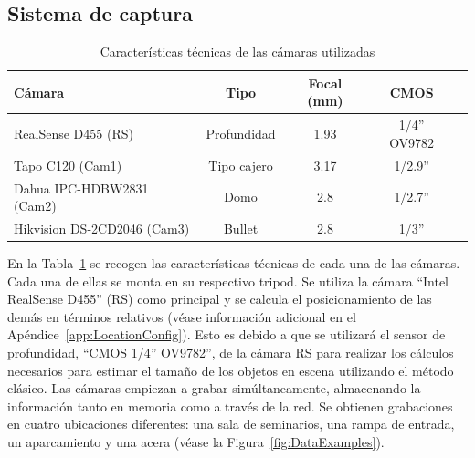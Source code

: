 \subsection{Sistema de captura}
\begin{table}[htp]
\scriptsize
\centering
\begin{tabular}{lcccc}
\hline
\textbf{Cámara} & \textbf{Tipo} & \textbf{Focal (mm)} & \textbf{CMOS} \\
\hline
RealSense D455 (RS) & Profundidad & 1.93 &  1/4'' OV9782 \\
Tapo C120 (Cam1) & Tipo cajero & 3.17 &  1/2.9'' \\
Dahua IPC-HDBW2831 (Cam2) & Domo & 2.8 &  1/2.7'' \\
Hikvision DS-2CD2046 (Cam3) & Bullet & 2.8 &  1/3'' \\
\hline
\end{tabular}
\caption{Características técnicas de las cámaras utilizadas}
\label{tab:CaptureSystem}
\end{table}
En la Tabla~\ref{tab:CaptureSystem} se recogen las características técnicas de cada una de las cámaras.
Cada una de ellas se monta en su respectivo tripod. Se utiliza la cámara ``Intel RealSense D455'' (RS) como principal y
se calcula el posicionamiento de las demás en términos relativos (véase información adicional en el Apéndice~\ref{app:LocationConfig}).
Esto es debido a que se utilizará el sensor de profundidad, ``CMOS 1/4'' OV9782'', de la cámara RS para realizar los cálculos necesarios para estimar el
tamaño de los objetos en escena utilizando el método clásico. Las cámaras empiezan a grabar simúltaneamente, almacenando
la información tanto en memoria como a través de la red. Se obtienen grabaciones en cuatro ubicaciones diferentes: una sala de seminarios,
una rampa de entrada, un aparcamiento y una acera (véase la Figura~\ref{fig:DataExamples}).
